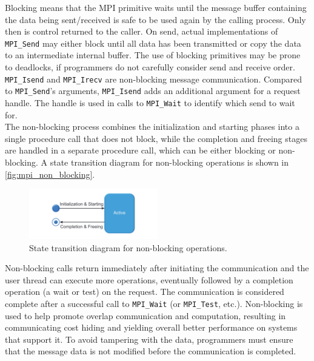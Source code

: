 Blocking means that the MPI primitive waits until the message buffer containing the data being sent/received is safe to be used again by the calling process. 
Only then is control returned to the caller.
On send, actual implementations of \texttt{MPI\_Send} may either block until all data has been transmitted or copy the data to an intermediate internal buffer. 
The use of blocking primitives may be prone to deadlocks, if programmers do not carefully consider send and receive order.
\texttt{MPI\_Isend} and \texttt{MPI\_Irecv} are non-blocking message communication. 
Compared to \texttt{MPI\_Send}'s arguments, \texttt{MPI\_Isend} adds an additional argument for a request handle. The handle is used in calls to \texttt{MPI\_Wait} to identify which send to wait for.\\
The non-blocking process combines the initialization and starting phases into a single procedure call that does not block, while the completion and freeing stages are handled in a separate procedure call, which can be either blocking or non-blocking.
A state transition diagram for non-blocking operations is shown in \autoref{fig:mpi_non_blocking}.\\
\begin{figure}[h!]
    \centering
    \includegraphics[width=0.5\textwidth]{pictures/mpi_non-blocking.png}
    \caption{State transition diagram for non-blocking operations. \cite{noauthor_mpi_nodate}}
    \label{fig:mpi_non_blocking}
\end{figure}
Non-blocking calls return immediately after initiating the communication and the user thread can execute more operations, eventually followed by a completion operation (a wait or test) on the request. The communication is considered complete after a successful call to \texttt{MPI\_Wait} (or \texttt{MPI\_Test}, etc.). 
Non-blocking is used to help promote overlap communication and computation, resulting in communicating cost hiding and yielding overall better performance on systems that support it. To avoid tampering with the data, programmers must ensure that the message data is not modified before the communication is completed.
